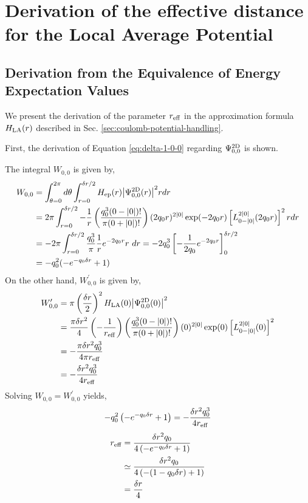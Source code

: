 \documentclass[wabun2025.tex]{subfiles}
\begin{document}
\appendix
\section{Derivation of the effective distance for the Local Average Potential}
\label{chap:appendix_derivation_derivation}
\subsection{Derivation from the Equivalence of Energy Expectation Values}
We present the derivation of the parameter $r_{\mathrm{eff}}$ in the approximation formula
$H_{\mathrm{LA}}(r)$ described in Sec. \ref{sec:coulomb-potential-handling}.

First, the derivation of Equation \eqref{eq:delta-1-0-0} regarding
$\Psi^{\mathrm{2D}}_{0,0}$ is shown.

The integral $W_{0,0}$ is given by,
\begin{align}
  W_{0,0}
   &= \int_{\theta=0}^{2\pi}d\theta
      \int_{r=0}^{\deltar/2}
      \Hep(r)\abs{\PsiTwoD_{0,0}(r)}^2r dr\notag\\
   &= 2\pi
      \int_{r=0}^{\deltar/2}
      -\frac{1}{r}\left(\frac{q_0^3(0-\abs{0})!}{\pi(0+\abs{0})!}\right)
      (2q_0r)^{2\abs{0}}\exp(-2q_0r)
      \left[L_{0-\abs{0}}^{2\abs{0}}(2q_0r)\right]^2 r dr\notag\\
   &= -2\pi\int_{r=0}^{\deltar/2}\frac{q_0^3}{\pi}\frac{1}{r}e^{-2q_0r}r\ dr=-2q_0^3
      \left[-\frac{1}{2q_0}e^{-2q_0r}\right]_{0}^{\deltar/2}\notag\\
   &=-q_0^2(-e^{-q_0\deltar}+1)
\end{align}
On the other hand, $W_{0,0}^\prime$ is given by,
\begin{align}
    W_{0,0}^\prime
    &=\pi\left(\frac{\delta r}{2}\right)^2
       H_{\mathrm{LA}}(0){\left| \Psi^{\mathrm{2D}}_{0,0}(0) \right|}^2\notag\\
    &=\frac{\pi\delta r^2}{4}\left(-\frac{1}{r_{\mathrm{eff}}}\right)
    \left(\frac{q_0^3(0-{\left| 0 \right|})!}{\pi(0+{\left| 0 \right|})!}\right)
    (0)^{2{\left| 0 \right|}}\exp(0)\left[L_{0-{\left| 0 \right|}}^{2{\left| 0 \right|}}(0)\right]^2\notag\\
    &= -\frac{\pi\delta r^2q_0^3}{4\pi r_{\mathrm{eff}}}\notag\\
    &= -\frac{\delta r^2q_0^3}{4r_{\mathrm{eff}}}
\end{align}
Solving $W_{0,0}=W_{0,0}^\prime$ yields,
\begin{equation}
-q_0^2\left(-e^{-q_0\delta r}+1\right)=-\frac{\delta r^2q_0^3}{4r_{\mathrm{eff}}}
\end{equation}
\begin{align}
r_{\mathrm{eff}}&=\frac{\delta r^2q_0}{4\left(-e^{-q_0\delta r}+1\right)}\notag\\
&\simeq\frac{\delta r^2q_0}{4\left(-(1-q_0\delta r)+1\right)}\notag\\
&=\frac{\delta r}{4}
\end{align}
\end{document}
